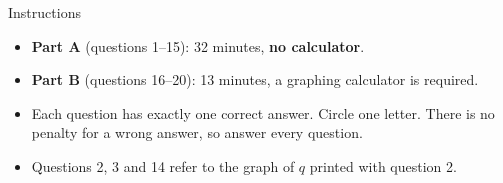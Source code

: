 \documentclass[11pt]{article}
\begin{document}

\begin{scorebox}{Instructions}
\begin{itemize}[leftmargin=*,itemsep=2pt,topsep=2pt]
  \item \textbf{Part A} (questions 1--15): 32 minutes, \textbf{no calculator}.
  \item \textbf{Part B} (questions 16--20): 13 minutes, a graphing calculator is required.
  \item Each question has exactly one correct answer. Circle one letter. There is no penalty for a wrong answer, so answer every question.
  \item Questions 2, 3 and 14 refer to the graph of $q$ printed with question 2.
\end{itemize}
\end{scorebox}
\end{document}
